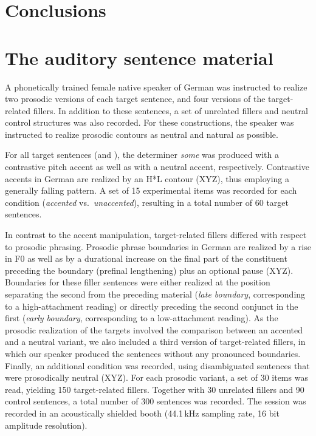 \documentclass[fleqn,reqno,10pt,draft]{article}
\newcommand{\as}{\acro{as}}
\renewcommand{\es}{\acro{es}}
\begin{document}
\section{Conclusions}
\label{sec:conclusions}

\appendix

\section{The auditory sentence material}
\label{sec:audit-sent-mater}

A phonetically trained female native speaker of German was instructed
to realize two prosodic versions of each target sentence, and four
versions of the target-related fillers. In addition to these
sentences, a set of unrelated fillers and neutral control structures
was also recorded. For these constructions, the speaker was instructed
to realize prosodic contours as neutral and natural as possible.

For all target sentences (\as and \es), the determiner \emph{some} was
produced with a contrastive pitch accent as well as with a neutral
accent, respectively. Contrastive accents in German are realized by an
H*L contour (XYZ), thus employing a generally
falling pattern. A set of 15 experimental items was recorded for each
condition (\emph{accented} vs.~\emph{unaccented}), resulting in a
total number of 60 target sentences.

In contrast to the accent manipulation, target-related fillers
differed with respect to prosodic phrasing. Prosodic phrase boundaries
in German are realized by a rise in F0 as well as by a durational
increase on the final part of the constituent preceding the boundary
(prefinal lengthening) plus an optional pause (XYZ). Boundaries for these filler sentences
were either realized at the position separating the second 
from the preceding material (\emph{late boundary}, corresponding to a
high-attachment reading) or directly preceding the second conjunct in
the first  (\emph{early boundary}, corresponding to a
low-attachment reading). As the prosodic realization of the targets
involved the comparison between an accented and a neutral variant, we
also included a third version of target-related fillers, in which our
speaker produced the sentences without any pronounced
boundaries. Finally, an additional condition was recorded, using
disambiguated sentences that were prosodically neutral (XYZ). For each prosodic variant, a set of
30 items was read, yielding 150 target-related fillers. Together with
30 unrelated fillers and 90 control sentences, a total number of 300
sentences was recorded. The session was recorded in an acoustically
shielded booth (44.1\,kHz sampling rate, 16 bit amplitude resolution).
\end{document}
